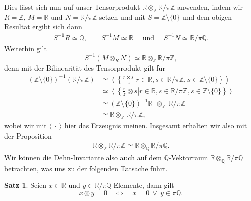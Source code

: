 \documentclass[11pt,titlepage]{article}
\newcommand{\setZ}{\mathbb{Z}}
\newcommand{\setQ}{\mathbb{Q}}
\newcommand{\setR}{\mathbb{R}}
\theoremstyle{definition}
\newtheorem{theorem}{Satz}[section]
\theoremstyle{remark}
\begin{document}
	Dies lässt sich nun auf unser Tensorprodukt 
	$\setR\otimes_{\setZ}\setR /\pi\setZ$ anwenden, indem wir $R=\setZ$, $M=\setR$ und $N=\setR /\pi\setZ$ setzen und mit 
	$S=\setZ\setminus\{0\}$ und dem obigen Resultat ergibt sich 
	dann
	\begin{align*}
		S^{-1}R\simeq\setQ,\qquad S^{-1}M\simeq\setR
		\quad\text{ und }\quad S^{-1}N\simeq\setR /\pi\setQ.
	\end{align*}
	Weiterhin gilt
	\[S^{-1}(M\otimes_R N)\simeq \setR\otimes_\setZ\setR/\pi\setZ,\]
	denn mit der Bilinearität des Tensorprodukt gilt für 
	\begin{align*}
		(\setZ\setminus\{0\})^{-1}(\setR /\pi\setZ)&\simeq
		\left.\left\langle \left\{\frac{r\otimes s}{z}\right\vert
		 r\in\setR,s\in\setR/\pi\setZ,s\in\setZ\setminus\{0\}\right\}\right\rangle \\
		 &\simeq \left.\left\langle \left\{\frac{r}{z}\otimes s\right\vert r\in\setR,s\in\setR/\pi\setZ,s\in\setZ\setminus\{0\}\right\}
		 \right\rangle \\
		 &\simeq (\setZ\setminus\{0\})^{-1}\setR\ \ \otimes_\setZ\  \setR/\pi\setZ \\
		 &\simeq \setR\otimes_\setZ \setR/\pi\setZ,
	\end{align*}
	wobei wir mit $\langle\ \cdot\ \rangle$ hier das Erzeugnis meinen.
	Insgesamt erhalten wir also mit der Proposition
	\begin{align}
		\setR\otimes_\setZ\setR/\pi\setZ\simeq\setR\otimes_\setQ\setR/\pi\setQ. \label{tensor=0}
	\end{align}
	Wir können die Dehn-Invariante also auch auf dem $\setQ$-Vektorraum 
	$\setR\otimes_\setQ\setR/\pi\setQ$ betrachten, was uns zu der folgenden 
	Tatsache führt.
	
	\begin{theorem} \label{bem:dehn=0}
		Seien $x\in \setR$ und $y\in\setR/\pi\setQ$ Elemente, dann gilt
		\[ x\otimes y =0 \quad \Leftrightarrow \quad x=0 \ \lor\ y\in\pi\setQ.\]
	\end{theorem}
	
\end{document}

